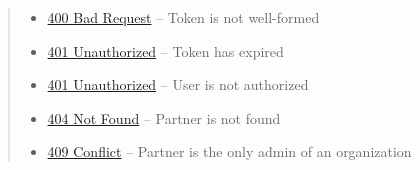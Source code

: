 \documentclass[letterpaper,10pt,english]{sphinxmanual}
\begin{document}
\begin{fulllineitems}
\begin{quote}
\begin{description}
\begin{itemize}
\item {} 
\href{http://www.w3.org/Protocols/rfc2616/rfc2616-sec10.html\#sec10.4.1}{400 Bad Request} -- Token is not well-formed

\item {} 
\href{http://www.w3.org/Protocols/rfc2616/rfc2616-sec10.html\#sec10.4.2}{401 Unauthorized} -- Token has expired

\item {} 
\href{http://www.w3.org/Protocols/rfc2616/rfc2616-sec10.html\#sec10.4.2}{401 Unauthorized} -- User is not authorized

\item {} 
\href{http://www.w3.org/Protocols/rfc2616/rfc2616-sec10.html\#sec10.4.5}{404 Not Found} -- Partner is not found

\item {} 
\href{http://www.w3.org/Protocols/rfc2616/rfc2616-sec10.html\#sec10.4.10}{409 Conflict} -- Partner is the only admin of an organization

\end{itemize}

\end{description}\end{quote}

\end{fulllineitems}
\end{document}
